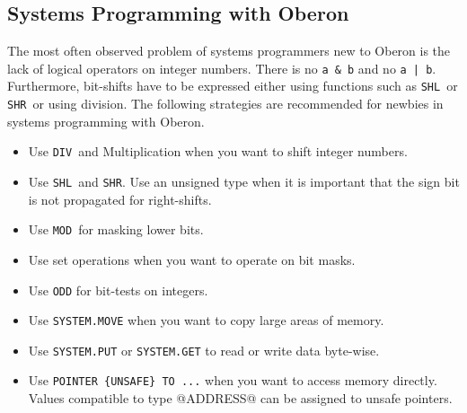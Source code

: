 \documentclass[a4wide,11pt]{article}
\newcommand{\DIV}{\lstinline"DIV"}
\newcommand{\MOD}{\lstinline"MOD"}
\newcommand{\SHL}{\lstinline"SHL"}
\newcommand{\SHR}{\lstinline"SHR"}
\begin{document}
\begin{annotation}
\section{Systems Programming with Oberon}
The most often observed problem of systems programmers new to Oberon is the lack of logical operators on integer numbers.
There is no \verb+a & b+ and no \verb+a | b+.
Furthermore, bit-shifts have to be expressed either using functions such as \SHL\ or \SHR\ or using division.
The following strategies are recommended for newbies in systems programming with Oberon.
\begin{itemize}
\item Use \DIV\ and Multiplication when you want to shift integer numbers.
\item Use \SHL\ and \SHR. Use an unsigned type when it is important that the sign bit is not propagated for right-shifts.
\item Use \MOD\ for masking lower bits.
\item Use set operations when you want to operate on bit masks.
\item Use \verb+ODD+ for bit-tests on integers.
\item Use \verb+SYSTEM.MOVE+ when you want to copy large areas of memory.
\item Use \verb+SYSTEM.PUT+ or \verb+SYSTEM.GET+ to read or write data byte-wise.
\item Use \verb+POINTER {UNSAFE} TO ...+ when you want to access memory directly.
Values compatible to type @ADDRESS@ can be assigned to unsafe pointers.
\end{itemize}


\end{annotation}
\end{document}
